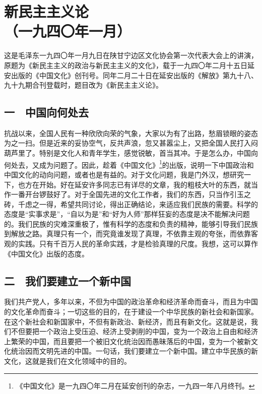 \documentclass[cn,11pt,chinese]{elegantbook}
\def\myformat#1{\hfil\hfil #1}
\begin{document}
\newpage\section*{\myformat{新民主主义论}\\\myformat{（一九四〇年一月）}}
\begin{introduction}\item  这是毛泽东一九四〇年一月九日在陕甘宁边区文化协会第一次代表大会上的讲演，原题为《新民主主义的政治与新民主主义的文化》，载于一九四〇年二月十五日延安出版的《中国文化》创刊号。同年二月二十日在延安出版的《解放》第九十八、九十九期合刊登载时，题目改为《新民主主义论》。\end{introduction}
\subsection*{\myformat{一　中国向何处去}}
抗战以来，全国人民有一种欣欣向荣的气象，大家以为有了出路，愁眉锁眼的姿态为之一扫。但是近来的妥协空气，反共声浪，忽又甚嚣尘上，又把全国人民打入闷葫芦里了。特别是文化人和青年学生，感觉锐敏，首当其冲。于是怎么办，中国向何处去，又成为问题了。因此，趁着《中国文化》\footnote[1]{《中国文化》是一九四〇年二月在延安创刊的杂志，一九四一年八月终刊。}的出版，说明一下中国政治和中国文化的动向问题，或者也是有益的。对于文化问题，我是门外汉，想研究一下，也方在开始。好在延安许多同志已有详尽的文章，我的粗枝大叶的东西，就当作一番开台锣鼓好了。对于全国先进的文化工作者，我们的东西，只当作引玉之砖，千虑之一得，希望共同讨论，得出正确结论，来适应我们民族的需要。科学的态度是“实事求是”，“自以为是”和“好为人师”那样狂妄的态度是决不能解决问题的。我们民族的灾难深重极了，惟有科学的态度和负责的精神，能够引导我们民族到解放之路。真理只有一个，而究竟谁发现了真理，不依靠主观的夸张，而依靠客观的实践。只有千百万人民的革命实践，才是检验真理的尺度。我想，这可以算作《中国文化》出版的态度。\\
\subsection*{\myformat{二　我们要建立一个新中国}}
我们共产党人，多年以来，不但为中国的政治革命和经济革命而奋斗，而且为中国的文化革命而奋斗；一切这些的目的，在于建设一个中华民族的新社会和新国家。在这个新社会和新国家中，不但有新政治、新经济，而且有新文化。这就是说，我们不但要把一个政治上受压迫、经济上受剥削的中国，变为一个政治上自由和经济上繁荣的中国，而且要把一个被旧文化统治因而愚昧落后的中国，变为一个被新文化统治因而文明先进的中国。一句话，我们要建立一个新中国。建立中华民族的新文化，这就是我们在文化领域中的目的。\\
\end{document}
